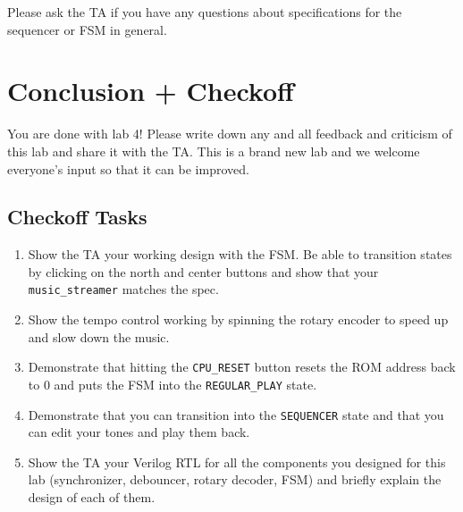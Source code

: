 \documentclass[11pt]{article}
\begin{document}
Please ask the TA if you have any questions about specifications for the sequencer or FSM in general.

\section{Conclusion + Checkoff}
You are done with lab 4! Please write down any and all feedback and criticism of this lab and share it with the TA. This is a brand new lab and we welcome everyone's input so that it can be improved.\\

\subsection{Checkoff Tasks}

\begin{enumerate}
	\item Show the TA your working design with the FSM. Be able to transition states by clicking on the north and center buttons and show that your \verb|music_streamer| matches the spec.
	
	\item Show the tempo control working by spinning the rotary encoder to speed up and slow down the music.
	
	\item Demonstrate that hitting the \verb|CPU_RESET| button resets the ROM address back to 0 and puts the FSM into the \verb|REGULAR_PLAY| state.
	
	\item Demonstrate that you can transition into the \verb|SEQUENCER| state and that you can edit your tones and play them back. 
	
	\item Show the TA your Verilog RTL for all the components you designed for this lab (synchronizer, debouncer, rotary decoder, FSM) and briefly explain the design of each of them.
\end{enumerate}
\end{document}
